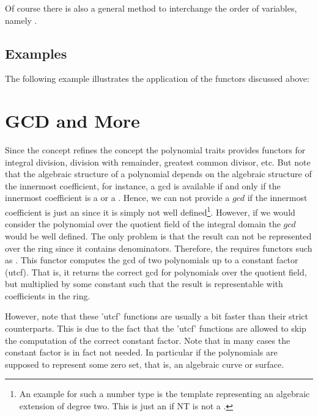 Of course there is also a general method to interchange the order of 
variables, namely .

\subsection{Examples}
The following example illustrates the application of the functors discussed 
above:


\section{GCD and More}

Since the concept  refines the concept 
 the polynomial traits provides functors for 
integral division, division with remainder, greatest common divisor, etc.
But note that the algebraic structure of a polynomial depends on the algebraic 
structure of the innermost coefficient, for instance, a gcd is available 
if and only if the innermost coefficient is a  or a 
. Hence, we can not provide a $gcd$ if the 
innermost coefficient is just an  since it is simply 
not well defined\footnote{%
An example for such a number type is the template 
 representing an algebraic extension of 
degree two. This is just an  if NT is not a . }.
% 
However, if we would consider the polynomial over the quotient field of the 
integral domain the $gcd$ would be well defined. The only problem is
that the result can not be represented over the ring since it contains 
denominators.   
Therefore, the  requires functors such as 
. 
This functor computes the gcd of two polynomials up to a constant factor (utcf).
That is, it returns the correct gcd for polynomials over the quotient field, 
but multiplied by some constant such that the result is representable with 
coefficients in the ring. 

However, note that these 'utcf' functions are usually a bit faster than their 
strict counterparts. This is due to the fact that the 'utcf' functions are allowed 
to skip the computation of the correct constant factor.
Note that in many cases the constant factor is in fact not needed.
In particular if the polynomials are supposed to represent some zero set, 
that is, an algebraic curve or surface.  

